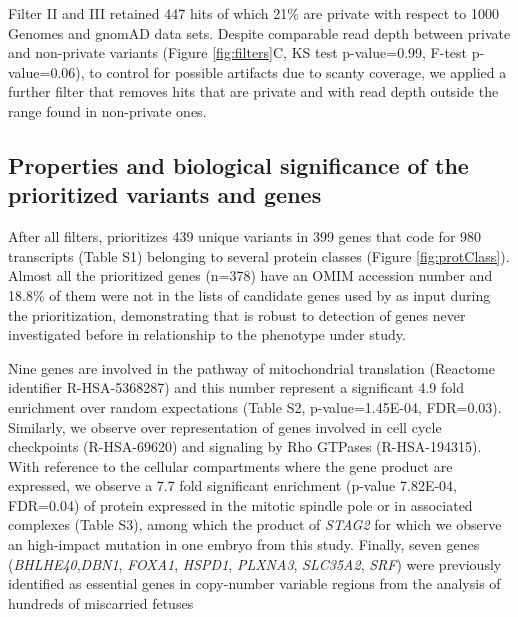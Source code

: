 Filter II and III retained 447 hits of which 21\% are private with respect to 1000 Genomes and gnomAD data sets. Despite comparable read depth between private and non-private variants (Figure \ref{fig:filters}C, KS test p-value=0.99, F-test p-value=0.06), to control for possible artifacts due to scanty coverage, we applied a further filter that removes hits that are private and with read depth outside the range found in non-private ones.  

\subsection*{Properties and biological significance of the prioritized variants and genes} 

After all filters, \gp prioritizes 439 unique variants in 399 genes that code for 980 transcripts (Table S1) belonging to several protein classes (Figure \ref{fig:protClass}). Almost all the prioritized genes (n=378) have an OMIM accession number and 18.8\% of them were not in the lists of candidate genes used by \gp as input during the prioritization, demonstrating that \gp is robust to detection of genes never investigated before in relationship to the phenotype under study. 

Nine genes are involved in the pathway of mitochondrial translation (Reactome identifier R-HSA-5368287) and this number represent a significant 4.9 fold enrichment over random expectations (Table S2, p-value=1.45E-04, FDR=0.03). Similarly, we observe over representation of genes involved in cell cycle checkpoints (R-HSA-69620) and signaling by Rho GTPases (R-HSA-194315). With reference to the cellular compartments where the gene product are expressed, we observe a 7.7 fold significant enrichment (p-value 7.82E-04, FDR=0.04) of protein expressed in the mitotic spindle pole or in associated complexes (Table S3), among which the product of \textit{STAG2} for which we observe an high-impact mutation in one embryo from this study. Finally, seven genes (\textit{BHLHE40},\textit{DBN1}, \textit{FOXA1}, \textit{HSPD1}, \textit{PLXNA3}, \textit{SLC35A2}, \textit{SRF}) were previously identified as essential genes in copy-number variable regions from the analysis of hundreds of miscarried fetuses \cite{chen2017characterization} %

